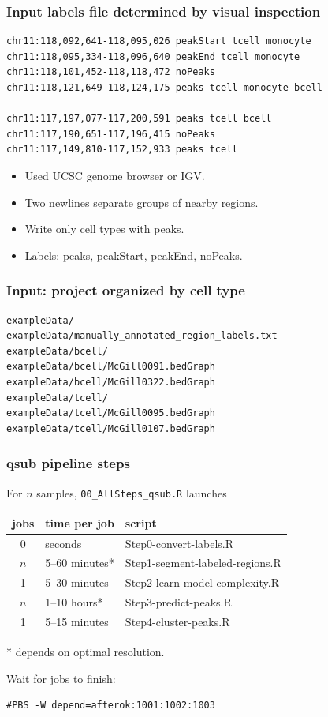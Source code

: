 \documentclass{beamer}
\begin{document}
\begin{frame}[fragile]
  \frametitle{Input labels file determined by visual inspection}
\begin{verbatim}
chr11:118,092,641-118,095,026 peakStart tcell monocyte
chr11:118,095,334-118,096,640 peakEnd tcell monocyte
chr11:118,101,452-118,118,472 noPeaks
chr11:118,121,649-118,124,175 peaks tcell monocyte bcell

chr11:117,197,077-117,200,591 peaks tcell bcell
chr11:117,190,651-117,196,415 noPeaks
chr11:117,149,810-117,152,933 peaks tcell 
\end{verbatim}
\begin{itemize}
\item Used UCSC genome browser or IGV.
\item Two newlines separate groups of nearby regions.
\item Write only cell types with peaks.
\item Labels: peaks, peakStart, peakEnd, noPeaks.
\end{itemize}

\end{frame}

\begin{frame}[fragile]
  \frametitle{Input: project organized by cell type}
\begin{verbatim}
exampleData/
exampleData/manually_annotated_region_labels.txt
exampleData/bcell/
exampleData/bcell/McGill0091.bedGraph  
exampleData/bcell/McGill0322.bedGraph
exampleData/tcell/
exampleData/tcell/McGill0095.bedGraph  
exampleData/tcell/McGill0107.bedGraph
\end{verbatim}

\end{frame}

\begin{frame}[fragile]
  \frametitle{qsub pipeline steps}
  For $n$ samples, \texttt{00\_AllSteps\_qsub.R} launches
  \begin{tabular}{cll}
    jobs & time per job & script \\
    \hline
    0 & seconds & Step0-convert-labels.R\\
    $n$ & 5--60 minutes* & Step1-segment-labeled-regions.R\\
    1 & 5--30 minutes & Step2-learn-model-complexity.R\\
    $n$ & 1--10 hours* & Step3-predict-peaks.R\\
    1 & 5--15 minutes & Step4-cluster-peaks.R
  \end{tabular}

* depends on optimal resolution.

\vskip 0.5cm

Wait for jobs to finish:
\begin{verbatim}
#PBS -W depend=afterok:1001:1002:1003
\end{verbatim}

\end{frame}
\end{document}
